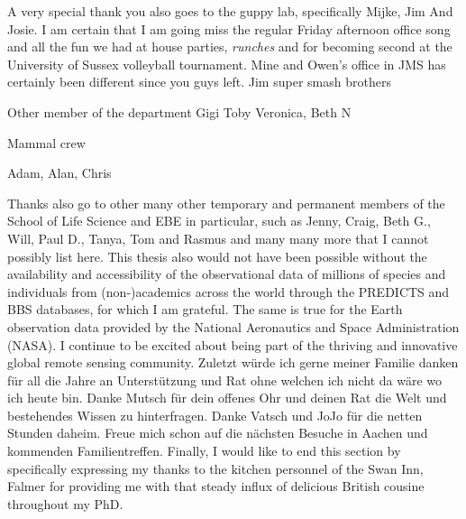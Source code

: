 A very special thank you also goes to the guppy lab, specifically Mijke, Jim And Josie. I am certain that I am going miss the regular Friday afternoon office song and all the fun we had at house parties, \textit{runches} and for becoming second at the University of Sussex volleyball tournament. Mine and Owen's office in JMS has certainly been different since you guys left.
Jim super smash brothers

Other member of the department
Gigi Toby
Veronica,
Beth N

Mammal crew

Adam, Alan, Chris

Thanks also go to other many other temporary and permanent members of the School of Life Science and EBE in particular, such as Jenny, Craig, Beth G., Will, Paul D., Tanya, Tom and Rasmus and many many more that I cannot possibly list here.
This thesis also would not have been possible without the availability and accessibility of the observational data of millions of species and individuals from (non-)academics across the world through the PREDICTS and BBS databases, for which I am grateful. The same is true for the Earth observation data provided by the National Aeronautics and Space Administration (NASA). I continue to be excited about being part of the thriving and innovative global remote sensing community. Zuletzt w\"{u}rde ich gerne meiner Familie danken für all die Jahre an Unterstützung und Rat ohne welchen ich nicht da w\"{a}re wo ich heute bin. Danke Mutsch f\"{u}r dein offenes Ohr und deinen Rat die Welt und bestehendes Wissen zu hinterfragen. Danke Vatsch und JoJo f\"{u}r die netten Stunden daheim. Freue mich schon auf die n\"{a}chsten Besuche in Aachen und kommenden Familientreffen. 
Finally, I would like to end this section by specifically expressing my thanks to the kitchen personnel of the Swan Inn, Falmer for providing me with that steady influx of delicious British cousine throughout my PhD. 